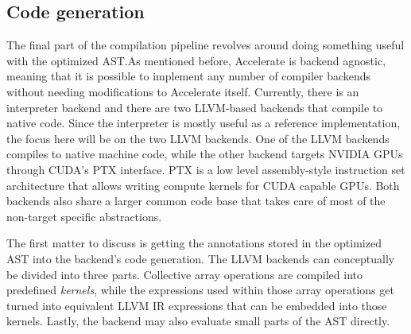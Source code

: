 \documentclass[fontsize=11pt,a4paper,parskip=half,numbers=noenddot]{scrartcl}
\begin{document}
\subsection{Code generation}


The final part of the compilation pipeline revolves around doing something
useful with the optimized AST.\@ As mentioned before, Accelerate is backend
agnostic, meaning that it is possible to implement any number of compiler
backends without needing modifications to Accelerate itself. Currently, there is
an interpreter backend and there are two LLVM-based backends that compile to
native code. Since the interpreter is mostly useful as a reference
implementation, the focus here will be on the two LLVM backends. One of the LLVM
backends compiles to native machine code, while the other backend targets NVIDIA
GPUs through CUDA's PTX interface. PTX is a low level assembly-style instruction
set architecture that allows writing compute kernels for CUDA capable GPUs. Both
backends also share a larger common code base that takes care of most of the
non-target specific abstractions.

The first matter to discuss is getting the annotations stored in the optimized
AST into the backend's code generation. The LLVM backends can conceptually be
divided into three parts. Collective array operations are compiled into
predefined \emph{kernels}, while the expressions used within those array
operations get turned into equivalent LLVM IR expressions that can be embedded
into those kernels. Lastly, the backend may also evaluate small parts of the AST
directly.
\end{document}
